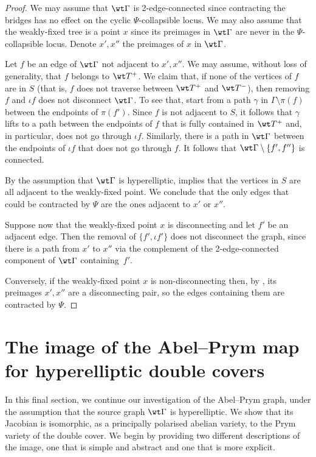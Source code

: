 \begin{proof}

    We may assume that $\wt\Gamma$ is 2-edge-connected since contracting the bridges has no effect on the cyclic $\Psi$-collapsible locus. We may also assume that the weakly-fixed tree is a point $x$ since its preimages in $\wt\Gamma$ are never in the $\Psi$-collapsible locus. Denote $x',x''$ the preimages of $x$ in $\wt\Gamma$. 

Let $f$ be an edge of $\wt\Gamma$ not adjacent to $x',x''$.
We may assume, without loss of generality, that $f$ belongs to $\wt T^+$.
We claim that, if  none of the vertices of $f$ are in $S$ (that is, $f$ does not traverse between $\wt T^+$ and $\wt T^-$), then removing $f$ and $\iota f$ does not disconnect $\wt\Gamma$. To see that, start from a path $\gamma$ in 
$\Gamma\setminus\pi(f)$ between the endpoints of $\pi(f')$. Since $f$ is not adjacent to $S$, it follows that $\gamma$ lifts to a path 
between the endpoints of $f$ that is fully contained in $\wt T^+$ and, in particular, does not go through $\iota f$. Similarly, there is a path in $\wt\Gamma$ between the endpoints of $\iota f$ that does not go through $f$. It follows that  $\wt\Gamma\setminus\{f',f''\}$ is connected.   

By the assumption that $\wt\Gamma$ is hyperelliptic,  implies that the  vertices in $S$ are all adjacent to the weakly-fixed point. We conclude that the only edges that could be contracted by $\Psi$ are the ones adjacent to $x'$ or $x''$. 

Suppose now that the weakly-fixed point $x$ is disconnecting and let $f'$ be an adjacent edge. Then the removal of $\{f',\iota f'\}$ does not disconnect the graph, since  there is a path from $x'$ to $x''$ via the complement of the 2-edge-connected component of $\wt\Gamma$ containing~$f'$. 

Conversely, if the weakly-fixed point $x$ is non-disconnecting then, by , its preimages $x',x''$ are  a disconnecting pair, so the edges containing them are contracted by $\Psi$. 
\end{proof}

\section{The image of the Abel--Prym map for hyperelliptic double covers}
\label{sec:hypcase}


In this final section, we continue our investigation of the  Abel--Prym graph, under the assumption that the source graph $\wt\Gamma$ is hyperelliptic. We show that its Jacobian
is isomorphic, as a principally polarised abelian variety, to the Prym variety of the double cover. 
We begin by providing two different descriptions of the image, one that is simple and abstract and one that is more explicit. 

